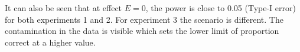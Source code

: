 \documentclass[12pt]{article}
\begin{document}

It can also be seen that at effect $E=0$, the power is close to 0.05 (Type-I error) for both experiments 1 and 2. For experiment 3 the scenario is different. The contamination in the data is visible which sets the lower limit of proportion correct at a higher value.  



%





\end{document}
